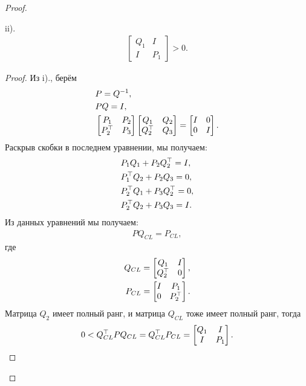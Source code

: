 \begin{proof}
\begin{lemma}
		ii). \begin{align*}
			\begin{bmatrix} 
				{Q}_{1} & I \\ 
				I & {P}_{1}
			\end{bmatrix} > 0.
		\end{align*}
	\end{lemma}
	\begin{proof}
		Из i)., берём 
		\begin{align}
			&{P} = {Q}^{-1},\\
			&{P}{Q}={I},\\
			&\begin{bmatrix} 
				{P}_{1} & {P}_{2}\\ 
				{P}_{2}^\top & {P}_{3} 
			\end{bmatrix}
			\begin{bmatrix} 
				{Q}_{1} & {Q}_{2} \\ 
				{Q}_{2}^\top & {Q}_{3}
			\end{bmatrix} = 
			\begin{bmatrix}
				{I} & 0 \\
				0 & {I}
			\end{bmatrix}.
		\end{align}
		Раскрыв скобки в последнем уравнении, мы получаем:
		\begin{align}
			&{P}_{1}{Q}_{1}+{P}_{2}{Q}_{2}^\top ={I},\\
			&{P}_{1}^\top{Q}_{2}+{P}_{2}{Q}_{3} =0\label{eq: lemma mult1},\\
			&{P}_{2}^\top{Q}_{1}+{P}_{3}{Q}_{2}^\top=0,\\
			&{P}_{2}^\top{Q}_{2}+{P}_{3}{Q}_{3}= {I} \label{eq: lemma mult2}.
		\end{align}
		Из данных уравнений мы получаем:
		\begin{align}
			{P}{Q}_{CL}={P}_{CL},
		\end{align}
		где
		\begin{align}
			{Q}_{CL}=
			\begin{bmatrix}
				{Q}_{1} & {I}\\
				{Q}_{2}^\top & 0
			\end{bmatrix},\\
			{P}_{CL}=
			\begin{bmatrix}
				{I} & {P}_{1} \\
				0 & {P}_{2}^\top
			\end{bmatrix}.
		\end{align}
		Матрица ${Q}_{2}$ имеет полный ранг, и матрица ${Q}_{CL}$ тоже имеет полный ранг, тогда
		\begin{align}
			0<{Q}_{CL}^\top {P} {Q}_{CL} = {Q}_{CL}^\top {P}_{CL} = 
			\begin{bmatrix} 
				{Q}_{1} & I \\ 
				I & {P}_{1}
			\end{bmatrix}.
		\end{align}
		

\end{proof}
\end{proof}
